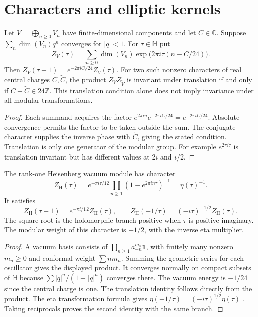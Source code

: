 \section{Characters and elliptic kernels}

\begin{proposition}
\label{thm:modular-anomaly}
Let $V=\bigoplus_{n\geq0}V_n$ have finite-dimensional components and let $C\in\mathbb C$.
Suppose $\sum_n\dim(V_n)q^n$ converges for $|q|<1$.
For $\tau\in\mathbb H$ put
\[
 Z_V(\tau)=\sum_{n\geq0}\dim(V_n)
             \exp\bigl(2\pi i\tau(n-C/24)\bigr).
\]
Then $Z_V(\tau+1)=e^{-2\pi i C/24}Z_V(\tau)$.
For two such nonzero characters of real central charges $C,\widetilde C$, the product $Z_V\overline{Z_{\widetilde V}}$ is invariant under translation if and only if $C-\widetilde C\in24\mathbb Z$.
This translation condition alone does not imply invariance under all modular transformations.
\end{proposition}
\begin{proof}
Each summand acquires the factor $e^{2\pi i n}e^{-2\pi iC/24}=e^{-2\pi iC/24}$.
Absolute convergence permits the factor to be taken outside the sum.
The conjugate character supplies the inverse phase with $\widetilde C$, giving the stated condition.
Translation is only one generator of the modular group.
For example $e^{2\pi i\tau}$ is translation invariant but has different values at $2i$ and $i/2$.
\end{proof}

\begin{theorem}
\label{thm:modular-invariance}
The rank-one Heisenberg vacuum module has character
\[
 Z_{\mathrm H}(\tau)=e^{-\pi i\tau/12}
                 \prod_{n\geq1}(1-e^{2\pi in\tau})^{-1}
                 =\eta(\tau)^{-1}.
\]
It satisfies
\[
 Z_{\mathrm H}(\tau+1)=e^{-\pi i/12}Z_{\mathrm H}(\tau),\qquad
 Z_{\mathrm H}(-1/\tau)=(-i\tau)^{-1/2}Z_{\mathrm H}(\tau).
\]
The square root is the holomorphic branch positive when $\tau$ is positive imaginary.
The modular weight of this character is $-1/2$, with the inverse eta multiplier.
\end{theorem}
\begin{proof}
A vacuum basis consists of $\prod_{n\geq1}a_{-n}^{m_n}\mathbf1$, with finitely many nonzero $m_n\geq0$ and conformal weight $\sum n m_n$.
Summing the geometric series for each oscillator gives the displayed product.
It converges normally on compact subsets of $\mathbb H$ because $\sum |q|^n/(1-|q|^n)$ converges there.
The vacuum energy is $-1/24$ since the central charge is one.
The translation identity follows directly from the product.
The eta transformation formula gives $\eta(-1/\tau)=(-i\tau)^{1/2}\eta(\tau)$ \cite[Eq.~23.18.5]{DLMF26}.
Taking reciprocals proves the second identity with the same branch.
\end{proof}

